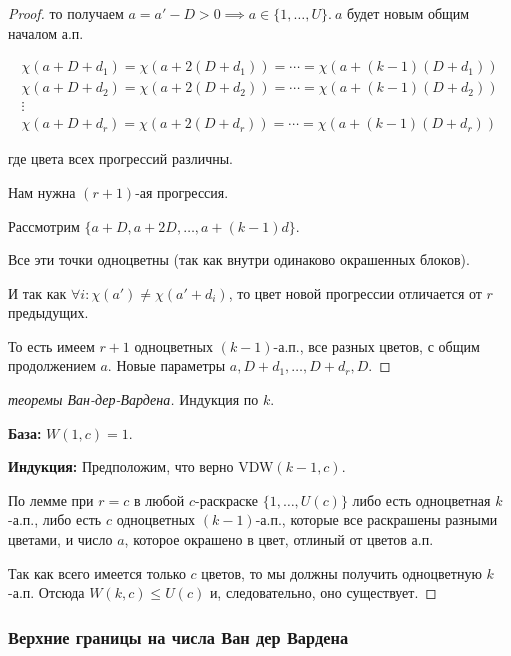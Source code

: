 \begin{normalsize}
\begin{proof}
    то получаем $a = a' - D > 0 \implies a \in \{1, \ldots, U\}.~a$ будет новым общим началом а.п.

    \begin{gather*}
        \chi(a + D + d_1) = \chi(a + 2(D + d_1)) = \cdots = \chi(a + (k - 1)(D + d_1))\\
        \chi(a + D + d_2) = \chi(a + 2(D + d_2)) = \cdots = \chi(a + (k - 1)(D + d_2))\\
        \vdots \\
        \chi(a + D + d_r) = \chi(a + 2(D + d_r)) = \cdots = \chi(a + (k - 1)(D + d_r))
    \end{gather*}

    где цвета всех прогрессий различны.

    Нам нужна $(r + 1)$-ая прогрессия.

    Рассмотрим $\{a + D, a + 2D, \ldots, a + (k - 1)d\}$.

    Все эти точки одноцветны (так как внутри одинаково окрашенных блоков).

    И так как $\forall i: \chi(a') \neq \chi(a' + d_i)$, то цвет новой прогрессии отличается от $r$ предыдущих.

    То есть имеем $r + 1$ одноцветных $(k - 1)$-а.п., все разных цветов, с общим продолжением $a$. Новые параметры $a, D + d_1, \ldots, D + d_r, D$.

\end{proof}

\begin{proof} [ теоремы Ван-дер-Вардена]
    
    Индукция по $k$.

    \textbf{База:} $W(1, c) = 1$.

    \textbf{Индукция:} Предположим, что верно VDW$(k - 1, c)$.

    По лемме при $r = c$ в любой $c$-раскраске $\{1, \ldots, U(c)\}$ либо есть одноцветная $k$-а.п., либо есть $c$ одноцветных $(k - 1)$-а.п., которые все раскрашены разными цветами, и число $a$, которое окрашено в цвет, отлиный от цветов а.п. 

    Так как всего имеется только $c$ цветов, то мы должны получить одноцветную $k$-а.п. Отсюда $W(k, c) \leq U(c)$ и, следовательно, оно существует.

\end{proof}

\subsubsection*{Верхние границы на числа Ван дер Вардена}


\end{normalsize}
